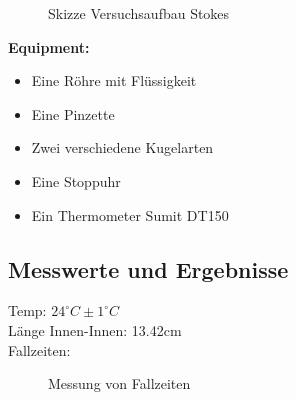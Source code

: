 \documentclass[12pt,a4paper]{article}
\begin{document}
\begin{multicols}{2}
\begin{figure}[H]
	\caption{Skizze Versuchsaufbau Stokes}
	\label{fig:visko_aufbau}
\end{figure}

\textbf{Equipment:}\\
\begin{itemize}
	\item Eine Röhre mit Flüssigkeit
	\item Eine Pinzette
	\item Zwei verschiedene Kugelarten
	\item Eine Stoppuhr
	\item Ein Thermometer Sumit DT150
\end{itemize}

\subsection{Messwerte und Ergebnisse}
Temp: $24^{\circ}C \pm 1^{\circ}C$\\
Länge Innen-Innen: 13.42cm\\
Fallzeiten:\\
\begin{figure}[H]
	\centering
	\caption{Messung von Fallzeiten}
	\label{fig:visko_fallzeit}
\end{figure}
\noindent


\end{multicols}
\end{document}
